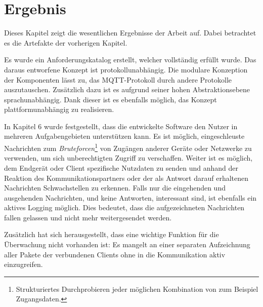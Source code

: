 \chapter{Ergebnis}
Dieses Kapitel zeigt die wesentlichen Ergebnisse der Arbeit auf. Dabei betrachtet es die Artefakte der vorherigen Kapitel.

Es wurde ein Anforderungskatalog erstellt, welcher vollständig erfüllt wurde.
Das daraus entworfene Konzept ist protokollunabhängig. Die modulare Konzeption der Komponenten lässt zu, das \ac{MQTT}-Protokoll durch andere Protokolle auszutauschen. Zusätzlich dazu ist es aufgrund seiner hohen Abstraktionsebene sprachunabhängig. Dank dieser ist es ebenfalls möglich, das Konzept plattformunabhängig zu realisieren.

In Kapitel 6 wurde festgestellt, dass die entwickelte Software den Nutzer in mehreren Aufgabengebieten unterstützen kann.
Es ist möglich, eingeschleuste Nachrichten zum \emph{Bruteforcen}\footnote{Strukturiertes Durchprobieren jeder möglichen Kombination von zum Beispiel Zugangsdaten.} von Zugängen anderer Geräte oder Netzwerke zu verwenden, um sich unberechtigten Zugriff zu verschaffen.
Weiter ist es möglich, dem Endgerät oder Client spezifische Nutzdaten zu senden und anhand der Reaktion des Kommunikationspartners oder der als Antwort darauf  erhaltenen Nachrichten Schwachstellen zu erkennen.
Falls nur die eingehenden und ausgehenden Nachrichten, und keine Antworten, interessant sind, ist ebenfalls ein aktives Logging möglich. Dies bedeutet, dass die aufgezeichneten Nachrichten fallen gelassen und nicht mehr weitergesendet werden.

Zusätzlich hat sich herausgestellt, dass eine wichtige Funktion für die Überwachung nicht vorhanden ist: Es mangelt an einer separaten Aufzeichnung aller Pakete der verbundenen Clients ohne in die Kommunikation aktiv einzugreifen.
